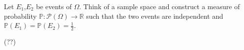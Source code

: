 \begin{my_ex}
	Let $E_1$,$E_2$ be events of $\Omega$. Think of a sample space and construct a measure of probability $\mathbb{P} : \mathcal{P}(\Omega) \to \mathbb{R}$ such that the two events are independent and $\mathbb{P}(E_1)=\mathbb{P}(E_2)=\frac{1}{2}$.
\end{my_ex}
\begin{my_notes}
	(??) %
\end{my_notes}

\begin{my_ex}

\end{my_ex}
\begin{my_notes}
	
\end{my_notes}
